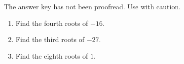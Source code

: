 The answer key has not been proofread. Use with caution.
\begin{enumerate}
\item Find the fourth roots of $-16$.


\item Find the third roots of $-27$.


\item Find the eighth roots of $1$.

\end{enumerate}

